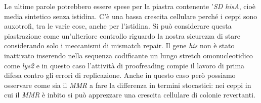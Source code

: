 Le ultime parole potrebbero essere spese per la piastra contenente '\emph{SD hisA}, cioè media sintetico senza istidina. 
C'è una bassa crescita cellulare perché i ceppi sono auxotrofi, tra le varie cose, anche per l'istidina. 
Si può considerare questa piastrazione come un'ulteriore controllo riguardo la nostra sicurezza di stare considerando solo i meccanismi di mismatch repair. 
Il gene \emph{his} non è stato inattivato inserendo nella sequenza codificante un lungo stretch omonucleotidico come \emph{lys2} e in questo caso l'attività di proofreading compie il lavoro di prima difesa contro gli errori di replicazione. 
Anche in questo caso però possiamo osservare come sia il \emph{MMR} a fare la differenza in termini stocastici: nei ceppi in cui il \emph{MMR}	è inbito si può apprezzare una crescita cellulare di colonie revertanti. 
